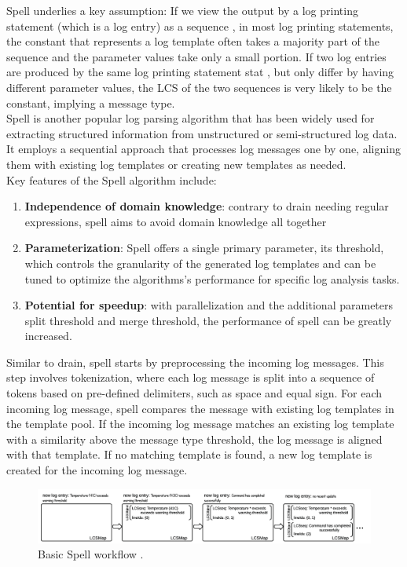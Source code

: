 Spell underlies a key assumption: If we view the output by a log printing statement (which is a log entry) as a sequence , in most log printing statements, the constant that represents a log template often takes a majority part of the sequence and the parameter values take only a small portion. If two log entries are produced by the same log printing statement stat , but only differ by having different parameter values, the LCS of the two sequences is very likely to be the constant, implying a message type.\\

Spell is another popular log parsing algorithm that has been widely used for extracting structured information from unstructured or semi-structured log data. It employs a sequential approach that processes log messages one by one, aligning them with existing log templates or creating new templates as needed.\\

Key features of the Spell algorithm include:
\begin{enumerate}
    \item \textbf{Independence of domain knowledge}: contrary to drain needing regular expressions, spell aims to avoid domain knowledge all together
    \item \textbf{Parameterization}: Spell offers a single primary parameter, its threshold, which controls the granularity of the generated log templates and can be tuned to optimize the algorithms's performance for specific log analysis tasks. 
    \item \textbf{Potential for speedup}: with parallelization and the additional parameters split threshold and merge threshold, the performance of spell can be greatly increased. 
\end{enumerate}

Similar to drain, spell starts by preprocessing the incoming log messages. This step involves tokenization, where each log message is split into a sequence of tokens based on pre-defined delimiters, such as space and equal sign. For each incoming log message, spell compares the message with existing log templates in the template pool. If the incoming log message matches an existing log template with a similarity above the message type threshold, the log message is aligned with that template. If no matching template is found, a new log template is created for the incoming log message.
\begin{figure}[H]
    \centering
    \includegraphics[keepaspectratio=true,scale=0.45]{figures/4_methods/5_spell_workflow.png}
    \caption{Basic Spell workflow \cite{spell}.}
    \label{fig:spellWorkflow}
\end{figure}

